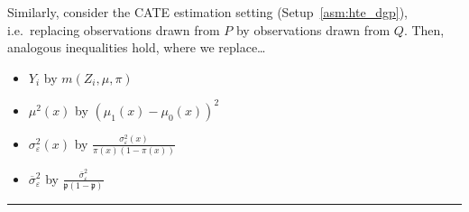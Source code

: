 \begin{lem}
	Similarly, consider the CATE estimation setting (Setup~\ref{asm:hte_dgp}), i.e.\ replacing observations drawn from $P$ by observations drawn from $Q$.
	Then, analogous inequalities hold, where we replace\dots
	\begin{multicols}{2}
		\begin{itemize}
			\item $Y_i$ by $m(Z_{i}, \mu, \pi)$
			\item $\mu^2(x)$ by $\left(\mu_1\left(x\right) - \mu_{0}\left(x\right)\right)^2$
			\item $\sigma^{2}_{\varepsilon}(x)$ by $\frac{\sigma_{\varepsilon}^2\left(x\right)}{\pi(x)\left(1 - \pi(x)\right)}$
			\item $\overline{\sigma}^{2}_{\varepsilon}$ by $\frac{\overline{\sigma}^2_{\varepsilon}}{\mathfrak{p}\left(1 - \mathfrak{p}\right)}$
		\end{itemize}   	
	\end{multicols}
\end{lem}

\hrule

